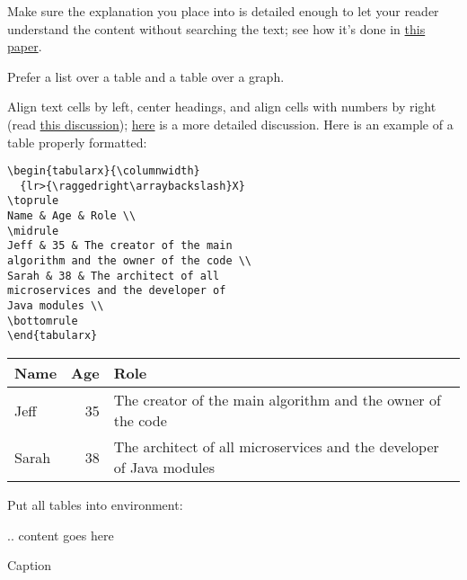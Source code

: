\documentclass[12pt,nonacm,natbib=false]{acmart}
\begin{document}
Make sure the explanation you place into  is detailed enough to let your reader understand the content without searching the text; see how it's done in \href{https://arxiv.org/abs/2203.07814}{this paper}.

Prefer a list over a table and a table over a graph.

Align text cells by left, center headings, and align cells with numbers by right (read \href{https://latex.org/forum/viewtopic.php?t=24435}{this discussion}); \href{https://ux.stackexchange.com/questions/24066/what-is-the-best-practice-for-data-table-cell-content-alignment}{here} is a more detailed discussion. Here is an example of a table properly formatted:

\begin{multicols}{2}
\setlength{\parskip}{0pt}
\small
\raggedcolumns
\begin{verbatim}
\begin{tabularx}{\columnwidth}
  {lr>{\raggedright\arraybackslash}X}
\toprule
Name & Age & Role \\
\midrule
Jeff & 35 & The creator of the main
algorithm and the owner of the code \\
Sarah & 38 & The architect of all
microservices and the developer of
Java modules \\
\bottomrule
\end{tabularx}
\end{verbatim}

\columnbreak

\begin{tabularx}{\columnwidth}
  {lr>{\raggedright\arraybackslash}X}
\toprule
Name & Age & Role \\
\midrule
Jeff & 35 & The creator of the main algorithm and the owner of the code \\
Sarah & 38 & The architect of all microservices and the developer of Java modules \\
\bottomrule
\end{tabularx}
\end{multicols}

Put all tables into  environment:

\begin{ffcode}
\begin{table}
.. content goes here
\caption{Caption}
\label{tab:my-table}
\end{table}
\end{ffcode}
\end{document}
